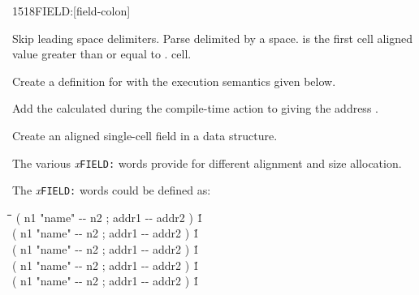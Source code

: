 \vspace*{-2ex}
\begin{worddef}{1518}{FIELD:}[field-colon]%
\item {}

	Skip leading space delimiters. Parse  delimited by
	a space.  is the first cell aligned value greater
	than or equal to .   cell.

	Create a definition for  with the execution semantics
	given below.

\execute[name]

	Add the  calculated during the compile-time action
	to  giving the address .


	\begin{rationale}
		Create an aligned single-cell field in a data structure.

		The various \emph{x}\texttt{FIELD:} words provide for different
		alignment and size allocation.

		The \emph{x}\texttt{FIELD:} words could be defined as:

		\begin{tabbing}
			\tab \= \tab[6] \= \tab[22] \= \tab[5] \= \tab[5.2] \= \kill
			\> \word{:}    \>( n1 "name" -{}- n2 ; addr1 -{}- addr2 )\>    \' 1    \>  \word{;} \\
			\> \word{:}   \>( n1 "name" -{}- n2 ; addr1 -{}- addr2 )\>                  \' 1    \>  \word{;} \\
			\> \word{:}   \>( n1 "name" -{}- n2 ; addr1 -{}- addr2 )\>   \' 1   \>  \word{;} \\
			\> \word{:}  \>( n1 "name" -{}- n2 ; addr1 -{}- addr2 )\>  \' 1  \>  \word{;} \\
			\> \word{:}  \>( n1 "name" -{}- n2 ; addr1 -{}- addr2 )\>  \' 1  \>  \word{;}
		\end{tabbing}
	\end{rationale}
\end{worddef}

